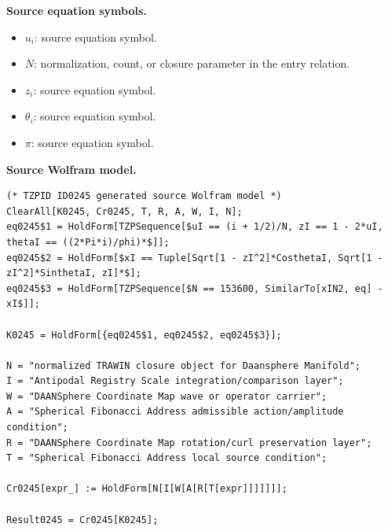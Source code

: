 \begin{minipage}[t]{0.49\linewidth}
\begingroup
\small
\raggedright
\textbf{Source equation symbols.}\par
\begin{itemize}[leftmargin=1.35em,itemsep=1pt,topsep=1pt,parsep=0pt]
    \item $u_i$: source equation symbol.
    \item $N$: normalization, count, or closure parameter in the entry relation.
    \item $z_i$: source equation symbol.
    \item $\theta_i$: source equation symbol.
    \item $\pi$: source equation symbol.
\end{itemize}
\endgroup
\end{minipage}\hfill
\begin{minipage}[t]{0.47\linewidth}
\begingroup
\scriptsize
\raggedright
\textbf{Source Wolfram model.}\par
\begin{Verbatim}[fontsize=\tiny,breaklines=true,breakanywhere=true]
(* TZPID ID0245 generated source Wolfram model *)
ClearAll[K0245, Cr0245, T, R, A, W, I, N];
eq0245$1 = HoldForm[TZPSequence[$uI == (i + 1/2)/N, zI == 1 - 2*uI, thetaI == ((2*Pi*i)/phi)*$]];
eq0245$2 = HoldForm[$xI == Tuple[Sqrt[1 - zI^2]*CosthetaI, Sqrt[1 - zI^2]*SinthetaI, zI]*$];
eq0245$3 = HoldForm[TZPSequence[$N == 153600, SimilarTo[xIN2, eq] - xI$]];

K0245 = HoldForm[{eq0245$1, eq0245$2, eq0245$3}];

N = "normalized TRAWIN closure object for Daansphere Manifold";
I = "Antipodal Registry Scale integration/comparison layer";
W = "DAANSphere Coordinate Map wave or operator carrier";
A = "Spherical Fibonacci Address admissible action/amplitude condition";
R = "DAANSphere Coordinate Map rotation/curl preservation layer";
T = "Spherical Fibonacci Address local source condition";

Cr0245[expr_] := HoldForm[N[I[W[A[R[T[expr]]]]]]];

Result0245 = Cr0245[K0245];
\end{Verbatim}
\endgroup
\end{minipage}

